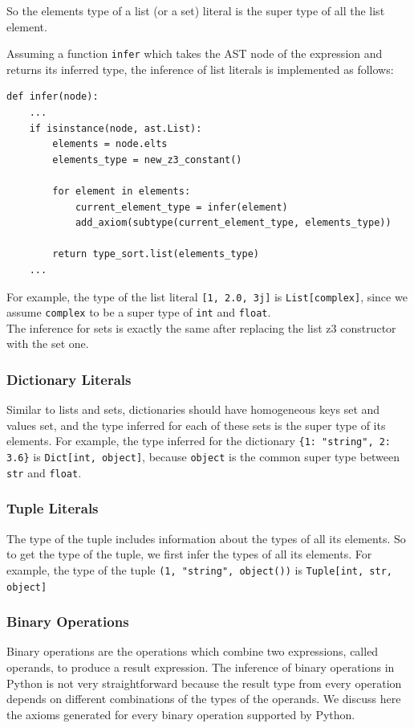 So the elements type of a list (or a set) literal is the super type of all the list element.

Assuming a function \lstinline|infer| which takes the AST node of the expression and returns its inferred type, the inference of list literals is implemented as follows:

\begin{lstlisting}
def infer(node):
	...
	if isinstance(node, ast.List):
		elements = node.elts
		elements_type = new_z3_constant()
		
		for element in elements:
			current_element_type = infer(element)
			add_axiom(subtype(current_element_type, elements_type))
			
		return type_sort.list(elements_type)
	...
\end{lstlisting}

For example, the type of the list literal \lstinline|[1, 2.0, 3j]| is \lstinline|List[complex]|, since we assume \lstinline|complex| to be a super type of \lstinline|int| and \lstinline|float|.\\

The inference for sets is exactly the same after replacing the list z3 constructor with the set one.


\subsubsection{Dictionary Literals}
Similar to lists and sets, dictionaries should have homogeneous keys set and values set, and the type inferred for each of these sets is the super type of its elements. For example, the type inferred for the dictionary \lstinline|{1: "string", 2: 3.6}| is \lstinline|Dict[int, object]|, because \lstinline|object| is the common super type between \lstinline|str| and \lstinline|float|.


\subsubsection{Tuple Literals}
The type of the tuple includes information about the types of all its elements. So to get the type of the tuple, we first infer the types of all its elements. For example, the type of the tuple \lstinline|(1, "string", object())| is \lstinline|Tuple[int, str, object]|

\subsubsection{Binary Operations}
Binary operations are the operations which combine two expressions, called operands, to produce a result expression. The inference of binary operations in Python is not very straightforward because the result type from every operation depends on different combinations of the types of the operands. We discuss here the axioms generated for every binary operation supported by Python.\\

